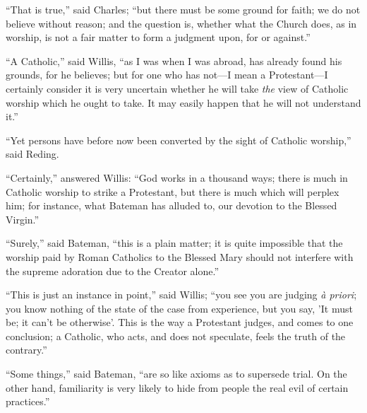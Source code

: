 ``That is true,'' said Charles; ``but there must be
some ground for faith; we do not believe without reason; and the
question is, whether what the Church does, as in worship, is not a
fair matter to form a judgment upon, for or against.''

``A Catholic,'' said Willis, ``as I was when I was
abroad, has already found his grounds, for he believes; but for one
who has not—I mean a Protestant—I certainly consider it is very
uncertain whether he will take \emph{the} view of Catholic worship
which he ought to take. It may easily happen that he will not
understand it.''

``Yet persons have before now been converted by the sight of
Catholic worship,'' said Reding.

``Certainly,'' answered Willis: ``God works in a
thousand ways; there is much in Catholic worship to strike a
Protestant, but there is much which will perplex him; for instance,
what Bateman has alluded to, our devotion to the Blessed Virgin.''

``Surely,'' said Bateman, ``this is a plain matter; it
is quite impossible that the worship paid by Roman Catholics to the
Blessed Mary should not interfere with the supreme adoration due to
the Creator alone.''

``This is just an instance in point,'' said Willis;
``you see you are judging \emph{à priori}; you know nothing of
the state of the case from experience, but you say, 'It must be; it
can't be otherwise'. This is the way a Protestant judges, and comes to
one conclusion; a Catholic, who acts, and does not speculate, feels
the truth of the contrary.''

``Some things,'' said Bateman, ``are so like axioms as
to supersede trial. On the other hand, familiarity is very likely to
hide from people the real evil of certain practices.''


